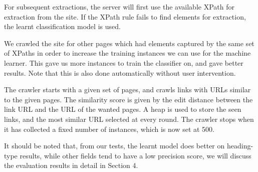 	
	
	For subsequent extractions, the server will first use the available XPath for extraction from the site.
	If the XPath rule fails to find elements for extraction, the learnt classification model is used.

	We crawled the site for other pages which had elements captured
	by the same set of XPaths in order to increase the training instances we can
	use for the machine learner. This gave us more instances to train the
	classifier on, and gave better results. Note that this is also done automatically
	without user intervention.
	
The crawler starts with a given set of pages, and crawls links with URLs similar to the given pages. The similarity score is given by the edit distance between the link URL and the URL of the wanted pages. A heap is used to store the seen links, and the most similar URL selected at every round. The crawler stops when it has collected a fixed number of instances, which is now set at 500.
	

It should be noted that, from our tests, the learnt model does better on heading-type results, while other
fields tend to have a low precision score, we will discuss the evaluation results in detail
in Section 4.
	